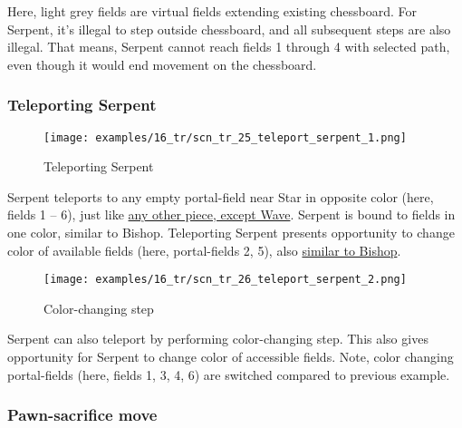 Here, light grey fields are virtual fields extending existing chessboard.
For Serpent, it's illegal to step outside chessboard, and all subsequent
steps are also illegal. That means, Serpent cannot reach fields 1 through
4 with selected path, even though it would end movement on the chessboard.

\clearpage %

\subsubsection*{Teleporting Serpent}
\label{sec:Tamoanchan Revisited/Serpent/Movement/Teleporting Serpent}

\vspace*{-1.0\baselineskip}
\noindent
\begin{figure}[!h]
\texttt{[image: examples/16\_tr/scn\_tr\_25\_teleport\_serpent\_1.png]}
\caption{Teleporting Serpent}
\label{fig:scn_tr_25_teleport_serpent_1}
\end{figure}

Serpent teleports to any empty portal-field near Star in opposite color
(here, fields 1 -- 6), just like
\hyperref[fig:scn_n_02_teleport_init]{any other piece, except Wave}.
Serpent is bound to fields in one color, similar to Bishop. Teleporting
Serpent presents opportunity to change color of available fields (here,
portal-fields 2, 5), also
\hyperref[fig:scn_n_14_teleport_bishop]{similar to Bishop}.

\clearpage %

\vspace*{-1.0\baselineskip}
\noindent
\begin{figure}[!h]
\texttt{[image: examples/16\_tr/scn\_tr\_26\_teleport\_serpent\_2.png]}
\caption{Color-changing step}
\label{fig:scn_tr_26_teleport_serpent_2}
\end{figure}

Serpent can also teleport by performing color-changing step. This also
gives opportunity for Serpent to change color of accessible fields. Note,
color changing portal-fields (here, fields 1, 3, 4, 6) are switched
compared to previous example.

\clearpage %

\subsubsection*{Pawn-sacrifice move}
\label{sec:Tamoanchan Revisited/Serpent/Movement/Pawn-sacrifice move}

